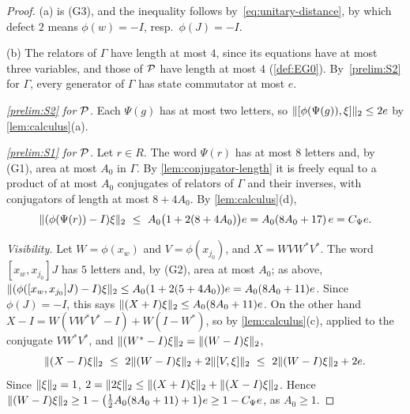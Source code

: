 \begin{proof}
(a) is (G3), and the inequality follows by~\eqref{eq:unitary-distance}, by which defect $2$ means $\phi(w)=-I$, resp.\ $\phi(J)=-I$.

(b) The relators of $\Gamma$ have length at most $4$, since its equations have at most three variables, and those of $\mathcal P$ have length
at most $4$ (\cref{def:EG0}). By~\ref{prelim:S2} for $\Gamma$, every generator of $\Gamma$ has state commutator at most $e$.

\emph{\ref{prelim:S2} for $\mathcal P$.} Each $\Psi(g)$ has at most two letters, so $\lVert [\phi(\Psi(g)),\xi]\rVert_2\le2e$ by \cref{lem:calculus}(a).

\emph{\ref{prelim:S1} for $\mathcal P$.} Let $r\in R$. The word $\Psi(r)$ has at most $8$ letters and, by (G1), area at most $A_0$ in $\Gamma$. By
\cref{lem:conjugator-length} it is freely equal to a product of at most $A_0$ conjugates of relators of $\Gamma$ and their inverses, with
conjugators of length at most $8+4A_0$. By \cref{lem:calculus}(d),
\[
\hs{(\phi(\Psi(r))-I)\xi}\ \le\ A_0\bigl(1+2(8+4A_0)\bigr)e=A_0(8A_0+17)\,e=C_\Psi e .
\]

\emph{Visibility.} Let $W=\phi(x_w)$ and $V=\phi(x_{j_0})$, and $X=WVW^*V^*$. The word $[x_w,x_{j_0}]J$ has $5$ letters and, by (G2), area at
most $A_0$; as above, $\lVert (\phi([x_w,x_{j_0}]J)-I)\xi\rVert_2\le A_0(1+2(5+4A_0))e=A_0(8A_0+11)e$. Since $\phi(J)=-I$, this says
$\lVert (X+I)\xi\rVert_2\le A_0(8A_0+11)e$. On the other hand $X-I=W(VW^*V^*-I)+W(I-W^*)$, so by \cref{lem:calculus}(c), applied to the conjugate
$VW^*V^*$, and $\lVert (W^*-I)\xi\rVert_2=\lVert (W-I)\xi\rVert_2$,
\[
\hs{(X-I)\xi}\ \le\ 2\hs{(W-I)\xi}+2\hs{[V,\xi]}\ \le\ 2\hs{(W-I)\xi}+2e .
\]
Since $\lVert \xi\rVert_2=1$, $2=\lVert 2\xi\rVert_2\le\lVert (X+I)\xi\rVert_2+\lVert (X-I)\xi\rVert_2$. Hence
$\lVert (W-I)\xi\rVert_2\ge1-\bigl(\frac12A_0(8A_0+11)+1\bigr)e\ge1-C_\Psi e$, as $A_0\ge1$.
\end{proof}


